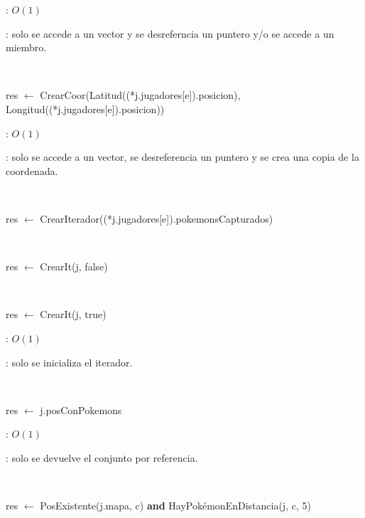 \begin{Algoritmos}
	\complejidad: $O(1)$

	\justifcomp: solo se accede a un vector y se desreferncia un puntero y/o se accede a un miembro.

	~

	\begin{algorithm}[H]
		\NoCaptionOfAlgo
		\caption{}
		res $\leftarrow$ CrearCoor(Latitud((*j.jugadores[e]).posicion), Longitud((*j.jugadores[e]).posicion))
	\end{algorithm}

	\complejidad: $O(1)$

	\justifcomp: solo se accede a un vector, se desreferencia un puntero y se crea una copia de la coordenada.

	~

	\begin{algorithm}[H]
		\NoCaptionOfAlgo
		\caption{}
		res $\leftarrow$ CrearIterador((*j.jugadores[e]).pokemonsCapturados)
	\end{algorithm}

	~

	\begin{algorithm}[H]
		\NoCaptionOfAlgo
		\caption{}
		res $\leftarrow$ CrearIt(j, false)
	\end{algorithm}

	~

	\begin{algorithm}[H]
		\NoCaptionOfAlgo
		\caption{}
		res $\leftarrow$ CrearIt(j, true)
	\end{algorithm}

	\complejidad: $O(1)$

	\justifcomp: solo se inicializa el iterador. 

	~

	\begin{algorithm}[H]
		\NoCaptionOfAlgo
		\caption{}
		res $\leftarrow$ j.posConPokemons
	\end{algorithm}

	\complejidad: $O(1)$

	\justifcomp: solo se devuelve el conjunto por referencia.

	~

	\begin{algorithm}[H]
		\NoCaptionOfAlgo
		\caption{}
		res $\leftarrow$ PosExistente(j.mapa, c) \textbf{and} HayPokémonEnDistancia(j, c, 5)
	\end{algorithm}


\end{Algoritmos}
